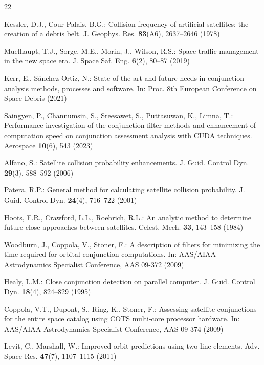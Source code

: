 \documentclass[runningheads]{llncs}
\begin{document}
\begin{thebibliography}{22}

 Kessler, D.J., Cour-Palais, B.G.: Collision frequency of artificial satellites: the creation of a debris belt. J. Geophys. Res. \textbf{83}(A6), 2637--2646 (1978)

 Muelhaupt, T.J., Sorge, M.E., Morin, J., Wilson, R.S.: Space traffic management in the new space era. J. Space Saf. Eng. \textbf{6}(2), 80--87 (2019)

 Kerr, E., S\'{a}nchez Ortiz, N.: State of the art and future needs in conjunction analysis methods, processes and software. In: Proc. 8th European Conference on Space Debris (2021)

 Saingyen, P., Channumsin, S., Sreesawet, S., Puttasuwan, K., Limna, T.: Performance investigation of the conjunction filter methods and enhancement of computation speed on conjunction assessment analysis with CUDA techniques. Aerospace \textbf{10}(6), 543 (2023)

 Alfano, S.: Satellite collision probability enhancements. J. Guid. Control Dyn. \textbf{29}(3), 588--592 (2006)

 Patera, R.P.: General method for calculating satellite collision probability. J. Guid. Control Dyn. \textbf{24}(4), 716--722 (2001)

 Hoots, F.R., Crawford, L.L., Roehrich, R.L.: An analytic method to determine future close approaches between satellites. Celest. Mech. \textbf{33}, 143--158 (1984)

 Woodburn, J., Coppola, V., Stoner, F.: A description of filters for minimizing the time required for orbital conjunction computations. In: AAS/AIAA Astrodynamics Specialist Conference, AAS 09-372 (2009)

 Healy, L.M.: Close conjunction detection on parallel computer. J. Guid. Control Dyn. \textbf{18}(4), 824--829 (1995)

 Coppola, V.T., Dupont, S., Ring, K., Stoner, F.: Assessing satellite conjunctions for the entire space catalog using COTS multi-core processor hardware. In: AAS/AIAA Astrodynamics Specialist Conference, AAS 09-374 (2009)

 Levit, C., Marshall, W.: Improved orbit predictions using two-line elements. Adv. Space Res. \textbf{47}(7), 1107--1115 (2011)


\end{thebibliography}
\end{document}
